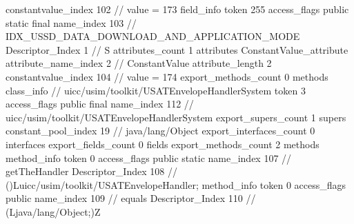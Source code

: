 {{{{{{{					constantvalue_index	102		// value = 173
				}
				}
			}
			field_info {
				token	255
				access_flags	public static final
				name_index	103		// IDX_USSD_DATA_DOWNLOAD_AND_APPLICATION_MODE
				Descriptor_Index	1		// S
				attributes_count	1
				attributes {
				ConstantValue_attribute {
					attribute_name_index	2		// ConstantValue
					attribute_length	2
					constantvalue_index	104		// value = 174
				}
				}
			}
			}
			export_methods_count	0
			methods {
			}
		}
		class_info {		// uicc/usim/toolkit/USATEnvelopeHandlerSystem
			token	3
			access_flags	public final
			name_index	112		// uicc/usim/toolkit/USATEnvelopeHandlerSystem
			export_supers_count	1
			supers {
				constant_pool_index	19		// java/lang/Object
			}
			export_interfaces_count	0
			interfaces {
			}
			export_fields_count	0
			fields {
			}
			export_methods_count	2
			methods {
				method_info {
					token	0
					access_flags	public static
					name_index	107		// getTheHandler
					Descriptor_Index	108		// ()Luicc/usim/toolkit/USATEnvelopeHandler;
				}
				method_info {
					token	0
					access_flags	public
					name_index	109		// equals
					Descriptor_Index	110		// (Ljava/lang/Object;)Z
				}
			}
		}
	}
}
